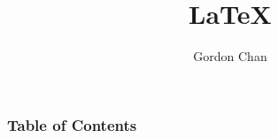 \documentclass{beamer}
\title{{\LaTeX}}
\author{Gordon Chan}
\begin{document}
\maketitle

\begin{frame}
    \frametitle{Table of Contents}
\end{frame}
\end{document}
